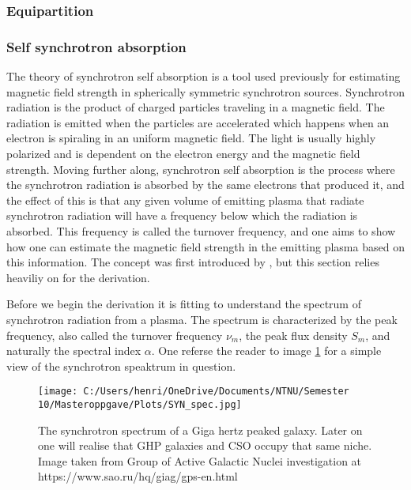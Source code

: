 \subsubsection{Equipartition}
\subsubsection{Self synchrotron absorption}


The theory of synchrotron self absorption is a tool used previously for estimating magnetic field strength in spherically symmetric synchrotron sources. Synchrotron radiation is the product of charged particles traveling in a magnetic field. The radiation is emitted when the particles are accelerated which happens when an electron is spiraling in an uniform magnetic field. The light is usually highly polarized and is dependent on the electron energy and the magnetic field strength. Moving further along, synchrotron self absorption is the process where the synchrotron radiation is absorbed by the same electrons that produced it, and the effect of this is that any given volume of emitting plasma that radiate synchrotron radiation will have a frequency below which the radiation is absorbed. This frequency is called the turnover frequency, and one aims to show how one can estimate the magnetic field strength in the emitting plasma based on this information. The concept was first introduced by \cite{1983ApJ...264..296M}, but this section relies heaviliy on \cite{Hirotani_2005} for the derivation. 

Before we begin the derivation it is fitting to understand the spectrum of synchrotron radiation from a plasma. The spectrum is characterized by the peak frequency, also called the turnover frequency $\nu_m$, the peak flux density $S_m$, and naturally the spectral index $\alpha$. One referse the reader to image \ref{fig:synchrotron_spectrum} for a simple view of the synchrotron speaktrum in question. 

\begin{figure}
    \centering
    \texttt{[image: C:/Users/henri/OneDrive/Documents/NTNU/Semester 10/Masteroppgave/Plots/SYN\_spec.jpg]}
    \caption{The synchrotron spectrum of a Giga hertz peaked galaxy. Later on one will realise that GHP galaxies and CSO occupy that same niche. Image taken from  Group of Active Galactic Nuclei investigation at https://www.sao.ru/hq/giag/gps-en.html }
    \label{fig:synchrotron_spectrum}
\end{figure}

